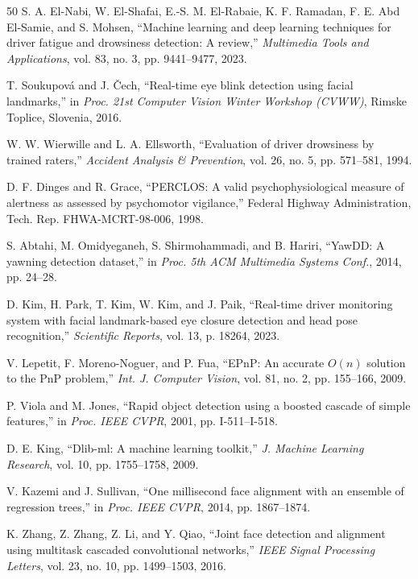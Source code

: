 \documentclass[conference]{IEEEtran}
\begin{document}
\begin{thebibliography}{50}
S. A. El-Nabi, W. El-Shafai, E.-S. M. El-Rabaie, K. F. Ramadan, F. E. Abd El-Samie, and S. Mohsen, ``Machine learning and deep learning techniques for driver fatigue and drowsiness detection: A review,'' \emph{Multimedia Tools and Applications}, vol. 83, no. 3, pp. 9441--9477, 2023.

T. Soukupov\'a and J. \v{C}ech, ``Real-time eye blink detection using facial landmarks,'' in \emph{Proc. 21st Computer Vision Winter Workshop (CVWW)}, Rimske Toplice, Slovenia, 2016.

W. W. Wierwille and L. A. Ellsworth, ``Evaluation of driver drowsiness by trained raters,'' \emph{Accident Analysis \& Prevention}, vol. 26, no. 5, pp. 571--581, 1994.

D. F. Dinges and R. Grace, ``PERCLOS: A valid psychophysiological measure of alertness as assessed by psychomotor vigilance,'' Federal Highway Administration, Tech. Rep. FHWA-MCRT-98-006, 1998.

S. Abtahi, M. Omidyeganeh, S. Shirmohammadi, and B. Hariri, ``YawDD: A yawning detection dataset,'' in \emph{Proc. 5th ACM Multimedia Systems Conf.}, 2014, pp. 24--28.

D. Kim, H. Park, T. Kim, W. Kim, and J. Paik, ``Real-time driver monitoring system with facial landmark-based eye closure detection and head pose recognition,'' \emph{Scientific Reports}, vol. 13, p. 18264, 2023.

V. Lepetit, F. Moreno-Noguer, and P. Fua, ``EPnP: An accurate $O(n)$ solution to the PnP problem,'' \emph{Int. J. Computer Vision}, vol. 81, no. 2, pp. 155--166, 2009.

P. Viola and M. Jones, ``Rapid object detection using a boosted cascade of simple features,'' in \emph{Proc. IEEE CVPR}, 2001, pp. I-511--I-518.

D. E. King, ``Dlib-ml: A machine learning toolkit,'' \emph{J. Machine Learning Research}, vol. 10, pp. 1755--1758, 2009.

V. Kazemi and J. Sullivan, ``One millisecond face alignment with an ensemble of regression trees,'' in \emph{Proc. IEEE CVPR}, 2014, pp. 1867--1874.

K. Zhang, Z. Zhang, Z. Li, and Y. Qiao, ``Joint face detection and alignment using multitask cascaded convolutional networks,'' \emph{IEEE Signal Processing Letters}, vol. 23, no. 10, pp. 1499--1503, 2016.


\end{thebibliography}
\end{document}
